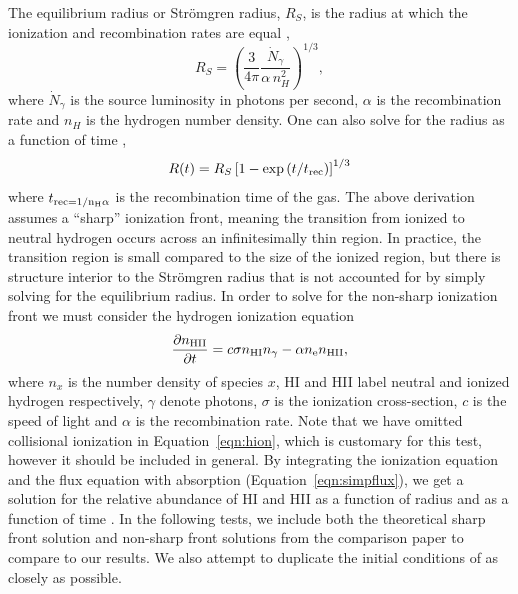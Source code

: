 \documentclass[fleq,usenatbib]{mnras}
\newcommand{\strom}{Str\"omgren}
\begin{document}
{The equilibrium radius or \strom{} radius, $R_S$, is the radius at which the 
ionization and recombination rates are equal \citep[e.g.][]{tielens05},
\begin{equation}
R_S = \left(\frac{3}{4\pi}\frac{\dot{N}_\gamma}{\alpha\, n^2_{H}}\right)^{1/3},
\end{equation}
where $\dot{N}_\gamma$ is the source luminosity in photons per second, 
$\alpha$ is the recombination rate and $n_H$ is the hydrogen number density. 
One can also solve for the radius as a function of time 
\citep[e.g.][]{spitzer78},
\begin{equation}\label{eqn:stromtime}
R(t) = R_S\left[1-\exp\left(t/t_{\rm rec}\right)\right]^{1/3}
\end{equation}
where $t_{\rm rec = 1/{n_H \alpha}}$ is the recombination time of the 
gas. The above derivation assumes a ``sharp'' ionization front, meaning the 
transition from ionized to neutral hydrogen occurs across an infinitesimally thin 
region. In practice, the transition region is small compared to the size of 
the ionized region, but there is structure interior to the \strom{} radius 
that is not accounted for by simply solving for the equilibrium radius. In 
order to solve for the non-sharp ionization front we must consider the 
hydrogen ionization equation
\begin{equation}\label{eqn:hion}
\frac{\partial n_{\rm HII}}{\partial t} = c \sigma n_{\rm HI} n_{\gamma} - 
\alpha n_{\rm e} n_{\rm HII},
\end{equation}
where $n_x$ is the number density of species $x$, HI and HII label neutral 
and ionized hydrogen respectively, $\gamma$ denote photons, $\sigma$ is the 
ionization cross-section, $c$ is the speed of light and $\alpha$ is the 
recombination rate. Note that we have omitted collisional ionization in 
Equation~\ref{eqn:hion}, which is customary for this test, however it 
should be included in general. By integrating the ionization equation and the 
flux equation with absorption (Equation~\ref{eqn:simpflux}), we get a solution 
for the relative abundance of HI and HII as a function of radius and as a 
function of time \citep{osterbrockFerland2006}. In the following tests, we 
include both the theoretical sharp front solution and non-sharp front 
solutions from the \cite{ilievEt06} comparison paper to compare to our 
results. We also attempt to duplicate the initial conditions of 
\cite{ilievEt06} as closely as possible.

}
\end{document}
